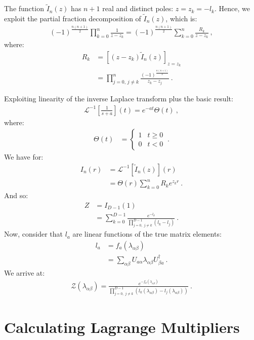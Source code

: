 \documentclass[draft,nofootinbib,pre,twocolumn,showpacs,showkeys,groupaddress,preprintnumbers,floatfix]{revtex4-1}
\newcommand{\1}{\mathbbm{1}}
\begin{document}
The function $\tilde{I}_n(z)$ has $n+1$ real and distinct poles: $z=z_k =
-l_k$. Hence, we exploit the partial fraction decomposition of
$\tilde{I}_n(z)$, which is:
\begin{align*}
(-1)^{\frac{n(n+1)}{2}} \prod_{k=0}^n \frac{1}{z-z_k}
  = (-1)^{\frac{n(n+1)}{2}} \sum_{k=0}^n \frac{R_k}{z-z_k}
  ~,
\end{align*}
where:
\begin{align*}
R_k & = \left[ (z-z_k)\tilde{I}_n(z)\right]_{z=z_k} \\
    & = \prod_{j=0, \, j \neq k}^n\frac{(-1)^{\frac{n(n+1)}{2}}}{z_k-z_j}
  ~.
\end{align*}

Exploiting linearity of the inverse Laplace transform plus the basic result:
\begin{align*}
\mathcal{L}^{-1}\left[\frac{1}{s+a}\right](t) = e^{-at}\Theta(t)
  ~,
\end{align*}
where:
\begin{align*}
\Theta(t) & = \begin{cases}
  1 & t \geq 0 \\
  0 & t < 0
\end{cases}
  ~.
\end{align*}
We have for:
\begin{align*}
I_n(r) & = \mathcal{L}^{-1}[\tilde{I}_n(z)](r) \\
  & = \Theta(r) \sum_{k=0}^n R_k e^{z_k r}
  ~.
\end{align*}
And so:
\begin{align*}
Z & = I_{D-1}(1) \\
  & = \sum_{k=0}^{D-1}
  \frac{ e^{-l_k} }{\prod_{j=0, \,\, j \neq k}^{D-1} (l_k - l_j)}
  ~.
\end{align*}
Now, consider that $l_a$ are linear functions of the true matrix elements:
\begin{align*}
l_a & = f_a(\lambda_{\alpha \beta}) \\
  & = \sum_{\alpha \beta}U_{a\alpha} \lambda_{\alpha \beta} U^\dagger_{\beta a}
  ~.
\end{align*}
We arrive at:
\begin{align*}
\mathcal{Z}(\lambda_{\alpha \beta}) = \frac{ e^{-f_k(\lambda_{\alpha\beta})} }{\prod_{j=0, \,\, j \neq k}^{D-1} (l_k(\lambda_{\alpha\beta}) - l_j(\lambda_{\alpha\beta}))}
  ~.
\end{align*}

\section{Calculating Lagrange Multipliers}
\label{App:Tau}
\end{document}
